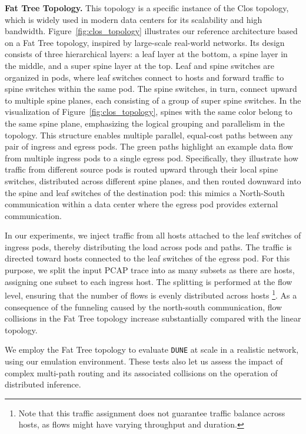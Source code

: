 \documentclass[journal]{IEEEtran}
\theoremstyle{plain} %
\newcommand{\eg}{\textit{e.g.},\xspace}
\newcommand{\name}{\texttt{\fontsize{9}{11}\selectfont DUNE}\xspace}
\begin{document}
\noindent \textbf{Fat Tree Topology.} This topology is a specific instance of the Clos topology, which is widely used in modern data centers for its scalability and high bandwidth. Figure~\ref{fig:clos_topology} illustrates our reference architecture based on a Fat Tree topology, inspired by large-scale real-world networks. Its design consists of three hierarchical layers: a leaf layer at the bottom, a spine layer in the middle, and a super spine layer at the top.
Leaf and spine switches are organized in pods, where leaf switches connect to hosts and forward traffic to spine switches within the same pod. The spine switches, in turn, connect upward to multiple spine planes, each consisting of a group of super spine switches. In the visualization of Figure~\ref{fig:clos_topology}, spines with the same color belong to the same spine plane, emphasizing the logical grouping and parallelism in the topology. This structure enables multiple parallel, equal-cost paths between any pair of ingress and egress pods.
The green paths highlight an example data flow from multiple ingress pods to a single egress pod. Specifically, they illustrate how traffic from different source pods is routed upward through their local spine switches, distributed across different spine planes, and then routed downward into the spine and leaf switches of the destination pod: this mimics a North-South communication within a data center where the egress pod provides external communication. 

In our experiments, we inject traffic from all hosts attached to the leaf switches of ingress pods, thereby distributing the load across pods and paths.
The traffic is directed toward hosts connected to the leaf switches of the egress pod.
For this purpose, we split the input PCAP trace into as many subsets as there are hosts, assigning one subset to each ingress host.
The splitting is performed at the flow level, ensuring that the number of flows is evenly distributed across hosts%
\footnote{Note that this traffic assignment does not guarantee traffic balance across hosts, as flows might have varying throughput and duration.}.
As a consequence of the funneling caused by the north-south communication, flow collisions in the Fat Tree topology increase substantially compared with the linear topology.

We employ the Fat Tree topology to evaluate \name at scale in a realistic network, using our emulation environment. 
These tests also let us assess the impact of complex multi-path routing and its associated collisions on the operation of distributed inference.
\vspace{-8pt}
\end{document}
